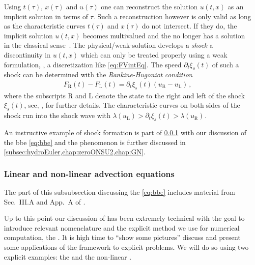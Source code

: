 Using $t(\tau)$, $x(\tau)$ and $u(\tau)$ one can reconstruct the solution $u(t,x)$ as an implicit solution in terms of $\tau$.
Such a reconstruction however is only valid as long as the characteristic curves $t(\tau)$ and $x(\tau)$ do not intersect.
If they do, the implicit solution $u(t,x)$ becomes multivalued and the \pde{} no longer has a solution in the classical sense~\cite{Vazquez-Cendon2015,LeVeque:2002,RezzollaZanotti:2013}.
The physical/weak-solution develops a \textit{shock} \dash{} a discontinuity in $u(t,x)$ \dash{} which can only be treated properly using a weak formulation, \eg{}, a \fv{} discretization like \cref{eq:FVintEq}.
The speed $\partial_t\xi_s(t)$ of such a shock can be determined with the \textit{Rankine-Hugoniot condition}~\cite{Rankine:1870,Hugoniot:1887}
\begin{align}
	F_\mathrm{R}(t)-F_\mathrm{L}(t)=\partial_t\xi_s(t)(u_\mathrm{R}-u_\mathrm{L})\label{eq:FVRHcondition}\, ,
\end{align}
where the subscripts $\mathrm{R}$ and $\mathrm{L}$ denote the state to the right and left of the shock $\xi_s(t)$, see, \eg{},  for further details.
The characteristic curves on both sides of the shock run into the shock wave with $\lambda(u_\mathrm{L})>\partial_t\xi_s(t)>\lambda(u_\mathrm{R})$.

An instructive example of shock formation is part of \cref{sububsec:LAEBBE} with our discussion of the \acrlong{bbe} \eqref{eq:bbe} and the phenomenon is further discussed in \cref{subsec:hydroEuler,chap:zeroONSU2,chap:GN}.

\subsubsection{Linear and non-linear advection equations}\label{sububsec:LAEBBE}
\begin{disclaimer}
	The part of this subsubsection discussing the  \eqref{eq:bbe} includes material from Sec.~III.A and App.~A of .
\end{disclaimer}
Up to this point our discussion of \cfd{} has been extremely technical with the goal to introduce relevant nomenclature and the explicit \fv{} method we use for numerical computation, \viz{} the \ktScheme{}. 
It is high time to ``show some pictures'' \dash{} discuss and present some applications of the framework to explicit problems.
We will do so using two explicit examples: the  and the non-linear .\bigskip


